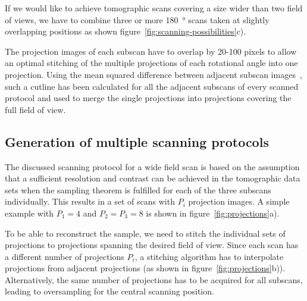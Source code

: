 If we would like to achieve tomographic scans covering a size wider than two field of views, we have to combine three or more \SI{180}{\degree} scans taken at slightly overlapping positions as shown figure~\ref{fig:scanning-possibilities}c).

The projection images of each subscan have to overlap by 20-100 pixels to allow an optimal stitching of the multiple projections of each rotational angle into one projection. Using the mean squared difference between adjacent subscan images~\cite{Hintermueller2009}, such a cutline has been calculated for all the adjacent subscans of every scanned protocol and used to merge the single projections into projections covering the full field of view.

\subsection{Generation of multiple scanning protocols}%
The discussed scanning protocol for a wide field scan is based on the assumption that a sufficient resolution and contrast can be achieved in the tomographic data sets when the sampling theorem is fulfilled for each of the three subscans individually. This results in a set of scans with $P_{i}$ projection images. A simple example with $P_{1}=4$ and $P_{2}=P_{3}=8$ is shown in figure~\ref{fig:projections}a).

To be able to reconstruct the sample, we need to stitch the individual sets of projections to projections spanning the desired field of view. Since each scan has a different number of projections $P_{i}$, a stitching algorithm has to interpolate projections from adjacent projections (as shown in figure~\ref{fig:projections}b)). Alternatively, the same number of projections has to be acquired for all subscans, leading to oversampling for the central scanning position.


